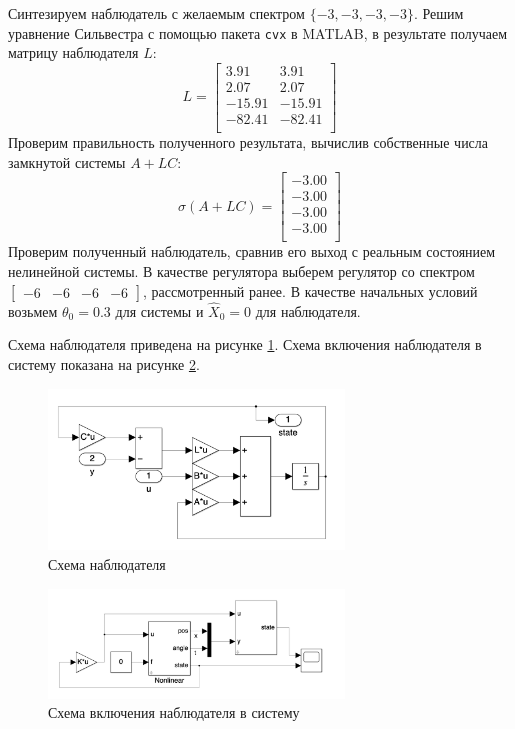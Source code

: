 Синтезируем наблюдатель с желаемым спектром $\{-3, -3, -3, -3\}$. 
Решим уравнение Сильвестра с помощью пакета \texttt{cvx} в MATLAB, в результате получаем матрицу наблюдателя $L$:
\begin{equation}
    L = \begin{bmatrix}
    3.91  & 3.91 \\ 
    2.07  & 2.07 \\ 
    -15.91  & -15.91 \\ 
    -82.41  & -82.41 \\ 
    \end{bmatrix}
\end{equation}
Проверим правильность полученного результата, вычислив собственные числа замкнутой системы $A + LC$: 
\begin{equation}
    \sigma(A + LC) = \begin{bmatrix}
    -3.00 \\ 
    -3.00 \\ 
    -3.00 \\ 
    -3.00 \\ 
    \end{bmatrix}
\end{equation}
Проверим полученный наблюдатель, сравнив его выход с реальным состоянием нелинейной системы. В качестве регулятора 
выберем регулятор со спектром $\begin{bmatrix}-6 & -6 & -6 & -6\end{bmatrix}$, рассмотренный ранее. В качестве 
начальных условий возьмем $\theta_0 = 0.3$ для системы и $\hat{X}_0 = 0$ для наблюдателя.

Схема наблюдателя приведена на рисунке \ref{fig:observer_scheme}. Схема включения наблюдателя в систему 
показана на рисунке \ref{fig:observer_system}. 
\begin{figure}[ht!]
    \centering
    \includegraphics[width=0.7\textwidth]{media/observer_scheme.png}
    \caption{Схема наблюдателя}
    \label{fig:observer_scheme}
\end{figure}
\begin{figure}[ht!]
    \centering
    \includegraphics[width=0.7\textwidth]{media/observer_system.png}
    \caption{Схема включения наблюдателя в систему}
    \label{fig:observer_system}
\end{figure}

